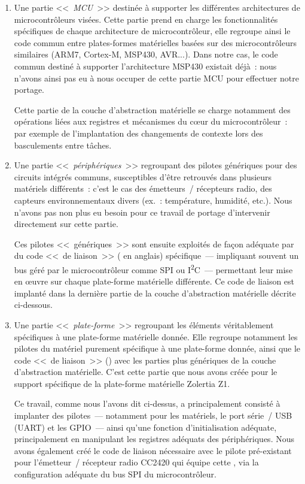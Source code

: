 \begin{enumerate}

\item Une partie <<~\emph{MCU}~>> destinée à supporter les différentes
architectures de microcontrôleurs visées. Cette partie prend en charge les
fonctionnalités spécifiques de chaque architecture de microcontrôleur,
elle regroupe ainsi le code commun entre plates-formes matérielles basées sur
des microcontrôleurs similaires (ARM7, Cortex-M, MSP430, AVR...). Dans notre
cas, le code commun destiné à supporter l'architecture MSP430 existait déjà~:
nous n'avons ainsi pas eu à nous occuper de cette partie MCU pour effectuer
notre portage.

Cette partie de la couche d'abstraction matérielle se charge notamment des
opérations liées aux registres et mécanismes du c{\oe}ur du microcontrôleur~:
par exemple de l'implantation des changements de contexte lors des
basculements entre tâches.

\item Une partie <<~\emph{périphériques}~>> regroupant des pilotes génériques
pour des circuits intégrés communs, susceptibles d'être retrouvés dans
plusieurs matériels différents~: c'est le cas des émetteurs~/ récepteurs
radio, des capteurs environnementaux divers (ex.~: température, humidité,
etc.). Nous n'avons pas non plus eu besoin pour ce travail de portage
d'intervenir directement sur cette partie.

Ces pilotes <<~génériques~>> sont ensuite exploités de façon adéquate par
du code <<~de liaison~>> ( en anglais) spécifique~---
impliquant souvent un bus géré par le microcontrôleur comme SPI ou
I\textsuperscript{2}C~--- permettant leur mise en {\oe}uvre sur chaque
plate-forme matérielle différente. Ce code de liaison est implanté dans
la dernière partie de la couche d'abstraction matérielle décrite ci-dessous.

\item Une partie <<~\emph{plate-forme}~>> regroupant les éléments
véritablement spécifiques à une plate-forme matérielle donnée. Elle
regroupe notamment les pilotes du matériel purement spécifique à une
plate-forme donnée, ainsi que le code <<~de liaison~>> ()
avec les parties plus génériques de la couche d'abstraction matérielle.
C'est cette partie que nous avons créée pour le support spécifique de
la plate-forme matérielle Zolertia Z1.

Ce travail, comme nous l'avons dit ci-dessus, a principalement consisté
à implanter des pilotes~--- notamment pour les  matériels,
le port série~/ USB (UART) et les GPIO~--- ainsi qu'une fonction
d'initialisation adéquate, principalement en manipulant les registres
adéquats des périphériques. Nous avons également créé le code de liaison
nécessaire avec le pilote pré-existant pour l'émetteur~/ récepteur radio
CC2420 qui équipe cette , via la configuration adéquate du bus
SPI du microcontrôleur.

\end{enumerate}


